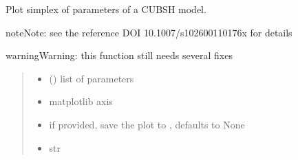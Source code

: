 \documentclass[letterpaper,10pt,english]{sphinxmanual}
\begin{document}
\begin{fulllineitems}
\label{\detokenize{cubmods:cubmods.cubsh.plot_simplex}}
\pysigstartsignatures
{}
\pysigstopsignatures
\sphinxAtStartPar
Plot simplex of parameters of a CUBSH model.

\begin{sphinxadmonition}{note}{Note:}
\sphinxAtStartPar
see the reference DOI 10.1007/s10260\sphinxhyphen{}011\sphinxhyphen{}0176\sphinxhyphen{}x for details
\end{sphinxadmonition}

\begin{sphinxadmonition}{warning}{Warning:}
\sphinxAtStartPar
this function still needs several fixes
\end{sphinxadmonition}
\begin{quote}\begin{description}
\begin{itemize}
\item {} 
\sphinxAtStartPar
{} () \textendash{} list of \sphinxcode{\sphinxupquote{{[}pi1, pi2{]}}} parameters

\item {} 
\sphinxAtStartPar
{} \textendash{} matplotlib axis

\item {} 
\sphinxAtStartPar
{} \textendash{} if provided, save the plot to , defaults to None

\item {} 
\sphinxAtStartPar
{} \textendash{} str

\end{itemize}

\end{description}\end{quote}

\end{fulllineitems}

\end{document}
